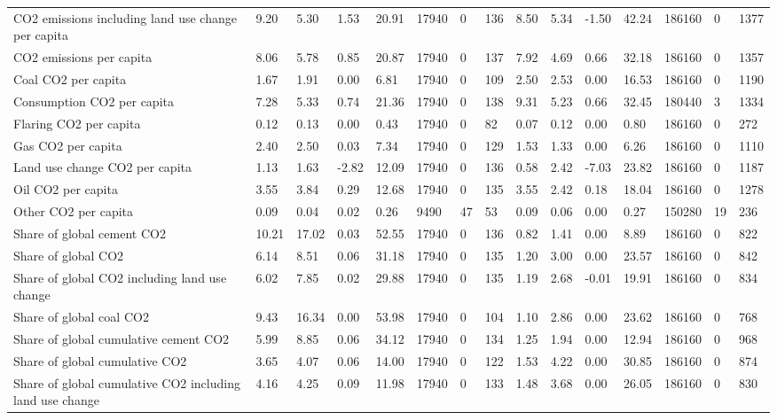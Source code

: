 \begin{longtable}{lllllllllllllll}
CO2 emissions including land use change per capita & 9.20 & 5.30 & 1.53 & 20.91 & 17940 & 0 & 136 & 8.50 & 5.34 & -1.50 & 42.24 & 186160 & 0 & 1377\\
CO2 emissions per capita & 8.06 & 5.78 & 0.85 & 20.87 & 17940 & 0 & 137 & 7.92 & 4.69 & 0.66 & 32.18 & 186160 & 0 & 1357\\
Coal CO2 per capita & 1.67 & 1.91 & 0.00 & 6.81 & 17940 & 0 & 109 & 2.50 & 2.53 & 0.00 & 16.53 & 186160 & 0 & 1190\\
Consumption CO2 per capita & 7.28 & 5.33 & 0.74 & 21.36 & 17940 & 0 & 138 & 9.31 & 5.23 & 0.66 & 32.45 & 180440 & 3 & 1334\\
\addlinespace
Flaring CO2 per capita & 0.12 & 0.13 & 0.00 & 0.43 & 17940 & 0 & 82 & 0.07 & 0.12 & 0.00 & 0.80 & 186160 & 0 & 272\\
Gas CO2 per capita & 2.40 & 2.50 & 0.03 & 7.34 & 17940 & 0 & 129 & 1.53 & 1.33 & 0.00 & 6.26 & 186160 & 0 & 1110\\
Land use change CO2 per capita & 1.13 & 1.63 & -2.82 & 12.09 & 17940 & 0 & 136 & 0.58 & 2.42 & -7.03 & 23.82 & 186160 & 0 & 1187\\
Oil CO2 per capita & 3.55 & 3.84 & 0.29 & 12.68 & 17940 & 0 & 135 & 3.55 & 2.42 & 0.18 & 18.04 & 186160 & 0 & 1278\\
Other CO2 per capita & 0.09 & 0.04 & 0.02 & 0.26 & 9490 & 47 & 53 & 0.09 & 0.06 & 0.00 & 0.27 & 150280 & 19 & 236\\
\addlinespace
Share of global cement CO2 & 10.21 & 17.02 & 0.03 & 52.55 & 17940 & 0 & 136 & 0.82 & 1.41 & 0.00 & 8.89 & 186160 & 0 & 822\\
Share of global CO2 & 6.14 & 8.51 & 0.06 & 31.18 & 17940 & 0 & 135 & 1.20 & 3.00 & 0.00 & 23.57 & 186160 & 0 & 842\\
Share of global CO2 including land use change & 6.02 & 7.85 & 0.02 & 29.88 & 17940 & 0 & 135 & 1.19 & 2.68 & -0.01 & 19.91 & 186160 & 0 & 834\\
Share of global coal CO2 & 9.43 & 16.34 & 0.00 & 53.98 & 17940 & 0 & 104 & 1.10 & 2.86 & 0.00 & 23.62 & 186160 & 0 & 768\\
Share of global cumulative cement CO2 & 5.99 & 8.85 & 0.06 & 34.12 & 17940 & 0 & 134 & 1.25 & 1.94 & 0.00 & 12.94 & 186160 & 0 & 968\\
\addlinespace
Share of global cumulative CO2 & 3.65 & 4.07 & 0.06 & 14.00 & 17940 & 0 & 122 & 1.53 & 4.22 & 0.00 & 30.85 & 186160 & 0 & 874\\
Share of global cumulative CO2 including land use change & 4.16 & 4.25 & 0.09 & 11.98 & 17940 & 0 & 133 & 1.48 & 3.68 & 0.00 & 26.05 & 186160 & 0 & 830\\

\end{longtable}
